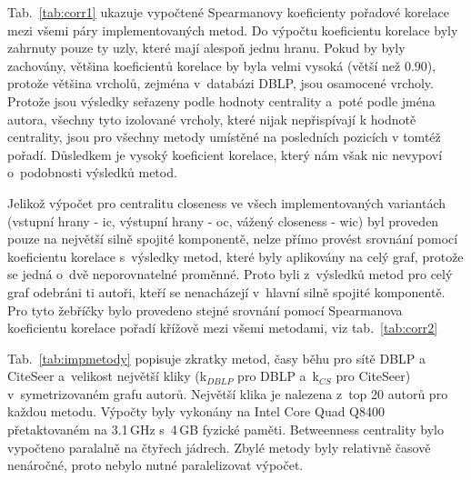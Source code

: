 \documentclass{bakalarka}
\begin{document}
Tab.~\ref{tab:corr1} ukazuje vypočtené Spearmanovy koeficienty pořadové
korelace mezi všemi páry implementovaných metod. Do výpočtu koeficientu
korelace byly zahrnuty pouze ty uzly, které mají alespoň jednu hranu. Pokud by
byly zachovány, většina koeficientů korelace by byla velmi vysoká (větší než
$0.90$), protože většina vrcholů, zejména v~databázi DBLP, jsou osamocené
vrcholy. Protože jsou výsledky seřazeny podle hodnoty centrality a~poté podle
jména autora, všechny tyto izolované vrcholy, které nijak nepřispívají k
hodnotě centrality, jsou pro všechny metody umístěné na posledních pozicích v
tomtéž pořadí. Důsledkem je vysoký koeficient korelace, který nám však nic
nevypoví o~podobnosti výsledků metod.

Jelikož výpočet pro centralitu closeness ve všech implementovaných variantách
(vstupní hrany - ic, výstupní hrany - oc, vážený closeness - wic) byl proveden
pouze na největší silně spojité komponentě, nelze přímo provést srovnání pomocí
koeficientu korelace s~výsledky metod, které byly aplikovány na celý graf,
protože se jedná o~dvě neporovnatelné proměnné. Proto byli z~výsledků metod pro
celý graf odebráni ti autoři, kteří se nenacházejí v~hlavní silně spojité
komponentě. Pro tyto žebříčky bylo provedeno stejné srovnání pomocí Spearmanova
koeficientu korelace pořadí křížově mezi všemi metodami, viz
tab.~\ref{tab:corr2}

Tab.~\ref{tab:impmetody} popisuje zkratky metod, časy běhu pro sítě DBLP a
CiteSeer a~velikost největší kliky (k$_{DBLP}$ pro DBLP a~k$_{CS}$ pro
CiteSeer) v~symetrizovaném grafu autorů. Největší klika je nalezena z~top 20
autorů pro každou metodu. Výpočty byly vykonány na Intel\textregistered
Core Quad Q8400 přetaktovaném na 3.1\,GHz s~4\,GB fyzické
paměti. Betweenness centrality bylo vypočteno paralalně na čtyřech jádrech.
Zbylé metody byly relativně časově nenáročné, proto nebylo nutné paralelizovat
výpočet.
\end{document}
